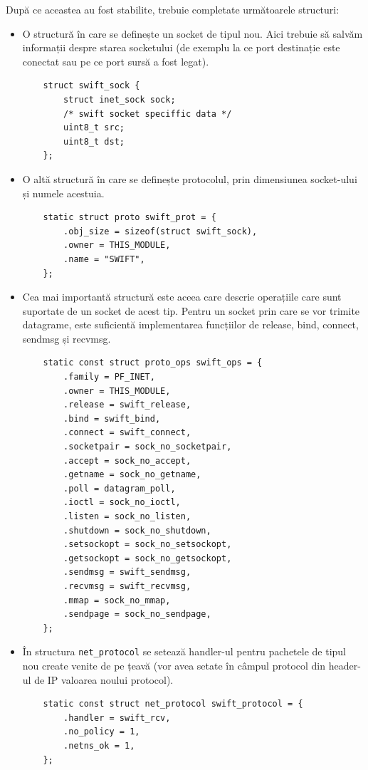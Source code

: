 După ce aceastea au fost stabilite, trebuie completate următoarele structuri:
\begin{itemize}
  \item O structură în care se definește un socket de tipul nou. Aici trebuie
  să salvăm informații despre starea socketului (de exemplu la ce port
  destinație este conectat sau pe ce port sursă a fost legat).
  \begin{verbatim}
    struct swift_sock {
        struct inet_sock sock;
        /* swift socket speciffic data */
        uint8_t src;
        uint8_t dst;
    };
  \end{verbatim}

  \item O altă structură în care se definește protocolul, prin dimensiunea
  socket-ului și numele acestuia.
  \begin{verbatim}
    static struct proto swift_prot = {
        .obj_size = sizeof(struct swift_sock),
        .owner = THIS_MODULE,
        .name = "SWIFT",
    };
  \end{verbatim}

  \item Cea mai importantă structură este aceea care descrie operațiile care
  sunt suportate de un socket de acest tip.  Pentru un socket prin care se vor
  trimite datagrame, este suficientă implementarea funcțiilor de release,
  bind, connect, sendmsg și recvmsg.
  \begin{verbatim}
    static const struct proto_ops swift_ops = {
        .family = PF_INET,
        .owner = THIS_MODULE,
        .release = swift_release,
        .bind = swift_bind,
        .connect = swift_connect,
        .socketpair = sock_no_socketpair,
        .accept = sock_no_accept,
        .getname = sock_no_getname,
        .poll = datagram_poll,
        .ioctl = sock_no_ioctl,
        .listen = sock_no_listen,
        .shutdown = sock_no_shutdown,
        .setsockopt = sock_no_setsockopt,
        .getsockopt = sock_no_getsockopt,
        .sendmsg = swift_sendmsg,
        .recvmsg = swift_recvmsg,
        .mmap = sock_no_mmap,
        .sendpage = sock_no_sendpage,
    };
    \end{verbatim}

  \item În structura \texttt{net\_protocol} se setează handler-ul pentru
  pachetele de tipul nou create venite de pe țeavă (vor avea setate în câmpul
  protocol din header-ul de IP valoarea noului protocol).
    \begin{verbatim}
    static const struct net_protocol swift_protocol = {
        .handler = swift_rcv,
        .no_policy = 1,
        .netns_ok = 1,
    };
    \end{verbatim}


\end{itemize}

